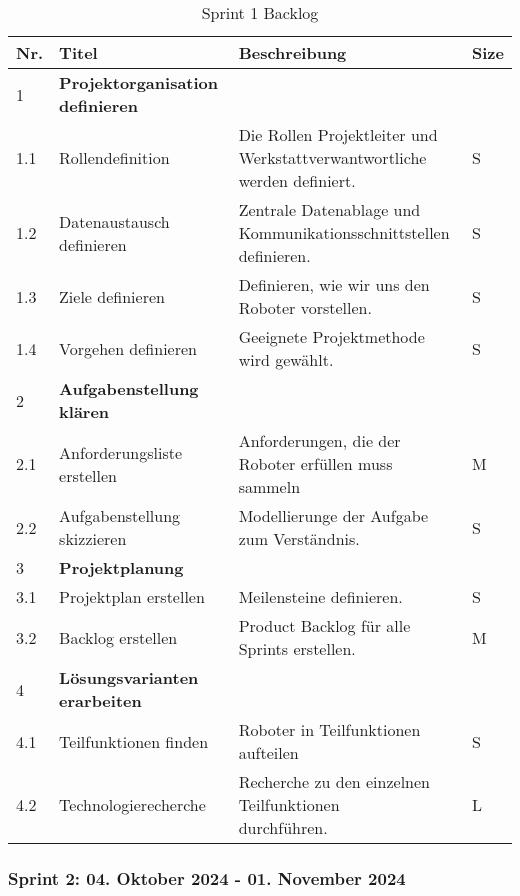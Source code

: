 \begin{table}[H]
\centering
\small
\begin{tabular}{|l|l|l| l|}
\hline
  \textbf{Nr.} & \textbf{Titel} & \textbf{Beschreibung} & \textbf{Size}\\
  \hline
  1  & \textbf{Projektorganisation definieren} &&\\
  \hline
  1.1  & Rollendefinition & \makecell{Die Rollen Projektleiter und\\ Werkstattverwantwortliche werden definiert.} & S\\
  \hline
  1.2 & Datenaustausch definieren & \makecell{Zentrale Datenablage und \\Kommunikationsschnittstellen definieren.}& S\\
  \hline
  1.3 & Ziele definieren & Definieren, wie wir uns den Roboter vorstellen. & S\\
  \hline
  1.4 & Vorgehen definieren & Geeignete Projektmethode wird gewählt. & S\\
  \hline
  2 & \textbf{Aufgabenstellung klären} && \\
  \hline
  2.1 & Anforderungsliste erstellen & \makecell{Anforderungen, die der Roboter erfüllen muss\\ sammeln}& M \\
  \hline
  2.2 & Aufgabenstellung skizzieren & Modellierunge der Aufgabe zum Verständnis. & S \\
  \hline
  3 & \textbf{Projektplanung} && \\
  \hline
  3.1 & Projektplan erstellen & Meilensteine definieren. & S \\
  \hline
  3.2 & Backlog erstellen & Product Backlog für alle Sprints erstellen. & M \\
  \hline
  4 & \textbf{Lösungsvarianten erarbeiten} && \\
  \hline
  4.1 & Teilfunktionen finden & Roboter in Teilfunktionen aufteilen & S \\
  \hline
  4.2 & Technologierecherche & \makecell{Recherche zu den einzelnen Teilfunktionen \\ durchführen.} & L\\
  \hline
 
\end{tabular}
\caption{Sprint 1 Backlog}
\label{table:sprint1-backlog}
\end{table}

\newpage
\subsubsection{Sprint 2: 04. Oktober 2024 - 01. November 2024}

